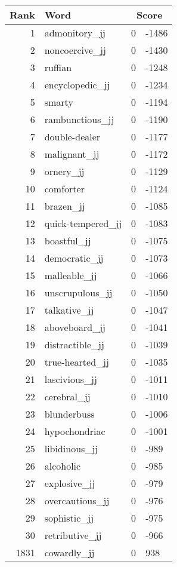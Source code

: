 \begin{longtable}[!htbp]{| rlr@{.}l |}
    \hline
    \textbf{Rank} & \textbf{Word} & \multicolumn{2}{c|}{\textbf{Score}} \\
    \hline
    \endhead
    1 & admonitory\_jj & 0 & -1486 \\
    2 & noncoercive\_jj & 0 & -1430 \\
    3 & ruffian & 0 & -1248 \\
    4 & encyclopedic\_jj & 0 & -1234 \\
    5 & smarty & 0 & -1194 \\
    6 & rambunctious\_jj & 0 & -1190 \\
    7 & double-dealer & 0 & -1177 \\
    8 & malignant\_jj & 0 & -1172 \\
    9 & ornery\_jj & 0 & -1129 \\
    10 & comforter & 0 & -1124 \\
    11 & brazen\_jj & 0 & -1085 \\
    12 & quick-tempered\_jj & 0 & -1083 \\
    13 & boastful\_jj & 0 & -1075 \\
    14 & democratic\_jj & 0 & -1073 \\
    15 & malleable\_jj & 0 & -1066 \\
    16 & unscrupulous\_jj & 0 & -1050 \\
    17 & talkative\_jj & 0 & -1047 \\
    18 & aboveboard\_jj & 0 & -1041 \\
    19 & distractible\_jj & 0 & -1039 \\
    20 & true-hearted\_jj & 0 & -1035 \\
    21 & lascivious\_jj & 0 & -1011 \\
    22 & cerebral\_jj & 0 & -1010 \\
    23 & blunderbuss & 0 & -1006 \\
    24 & hypochondriac & 0 & -1001 \\
    25 & libidinous\_jj & 0 & -989 \\
    26 & alcoholic & 0 & -985 \\
    27 & explosive\_jj & 0 & -979 \\
    28 & overcautious\_jj & 0 & -976 \\
    29 & sophistic\_jj & 0 & -975 \\
    30 & retributive\_jj & 0 & -966 \\
    1831 & cowardly\_jj & 0 & 938 \\

\end{longtable}
